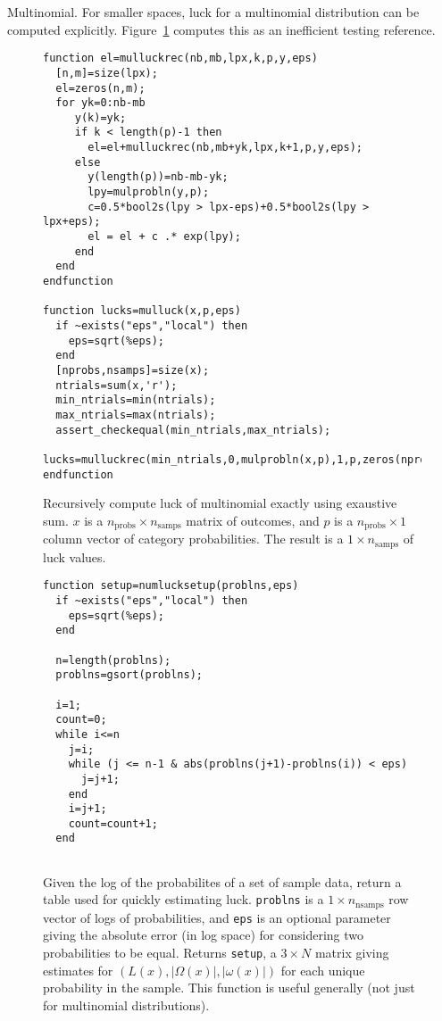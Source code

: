 \begin{example}{Multinomial.}
For smaller spaces, luck for a multinomial distribution can be computed explicitly.  Figure~\ref{fig:mulluck} computes this as an inefficient testing reference.
\begin{figure}
\caption{\label{fig:mulluck}Recursively compute luck of multinomial exactly using exaustive sum.  $x$ is a $n_{\text{probs}} \times n_{\text{samps}}$ matrix of outcomes, and $p$ is a $n_{\text{probs}} \times 1$ column vector of category probabilities.  The result is a $1 \times n_{\text{samps}}$ of luck values.}
\lstset{language=Scilab}
\begin{lstlisting}
function el=mulluckrec(nb,mb,lpx,k,p,y,eps)
  [n,m]=size(lpx);
  el=zeros(n,m);
  for yk=0:nb-mb
     y(k)=yk;
     if k < length(p)-1 then
       el=el+mulluckrec(nb,mb+yk,lpx,k+1,p,y,eps);
     else
       y(length(p))=nb-mb-yk;
       lpy=mulprobln(y,p);
       c=0.5*bool2s(lpy > lpx-eps)+0.5*bool2s(lpy > lpx+eps);
       el = el + c .* exp(lpy);
     end
  end
endfunction

function lucks=mulluck(x,p,eps)
  if ~exists("eps","local") then
    eps=sqrt(%eps);
  end
  [nprobs,nsamps]=size(x);
  ntrials=sum(x,'r');
  min_ntrials=min(ntrials);
  max_ntrials=max(ntrials);
  assert_checkequal(min_ntrials,max_ntrials);
  lucks=mulluckrec(min_ntrials,0,mulprobln(x,p),1,p,zeros(nprobs,1),eps)
endfunction
\end{lstlisting}
\end{figure}

\begin{figure}
\caption{\label{fig:numlucksetup}Given the log of the probabilites of a set of sample data, return a table used for quickly estimating luck.  {\tt problns} is a $1 \times n_{\text{nsamps}}$ row vector of logs of probabilities, and {\tt eps} is an optional parameter giving the absolute error (in log space) for considering two probabilities to be equal.  Returns {\tt setup}, a $3 \times N$ matrix giving estimates for $(L(x),|\Omega(x)|,|\omega(x)|)$ for each unique probability in the sample.  This function is useful generally (not just for multinomial distributions).}
\lstset{language=Scilab}
\begin{lstlisting}
function setup=numlucksetup(problns,eps)
  if ~exists("eps","local") then
    eps=sqrt(%eps);
  end

  n=length(problns);
  problns=gsort(problns);

  i=1;
  count=0;
  while i<=n
    j=i;
    while (j <= n-1 & abs(problns(j+1)-problns(i)) < eps)  
      j=j+1;
    end
    i=j+1;
    count=count+1;
  end


\end{lstlisting}
\end{figure}
\end{example}
